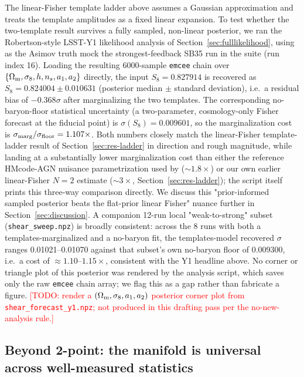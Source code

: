 \documentclass[11pt]{article}
\newcommand{\todo}[1]{\textcolor{red}{[TODO: #1]}}
\begin{document}
The linear-Fisher template ladder above assumes a Gaussian approximation and
treats the template amplitudes as a fixed linear expansion. To test whether
the two-template result survives a fully sampled, non-linear posterior, we
ran the Robertson-style LSST-Y1 likelihood analysis of
Section~\ref{sec:fulllikelihood}, using as the Asimov truth mock the
strongest-feedback SB35 run in the suite (run index 16). Loading the
resulting 6000-sample \texttt{emcee} chain over $\{\Omega_{\rm m},\sigma_8,h,n_s,a_1,a_2\}$
directly, the input $S_8=0.827914$ is recovered as
$S_8=0.824004\pm0.010631$ (posterior median $\pm$ standard deviation),
i.e.\ a residual bias of $-0.368\sigma$ after marginalizing the two
templates. %
The corresponding no-baryon-floor statistical uncertainty (a two-parameter,
cosmology-only Fisher forecast at the fiducial point) is
$\sigma(S_8)=0.009601$, so the marginalization cost is
$\sigma_{\rm marg}/\sigma_{\rm floor}=1.107\times$. %
Both numbers closely match the linear-Fisher template-ladder result of
Section~\ref{sec:res-ladder} in direction and rough magnitude, while landing
at a substantially lower marginalization cost than either the reference
HMcode-AGN nuisance parametrization used by \citet{robertson2026}
($\sim1.8\times$) or our own earlier linear-Fisher $N=2$ estimate
($\sim3\times$, Section~\ref{sec:res-ladder}); the script itself prints
this three-way comparison directly. %
We discuss this "prior-informed sampled posterior beats the flat-prior
linear Fisher" nuance further in Section~\ref{sec:discussion}. A companion
12-run local "weak-to-strong" subset (\texttt{shear\_sweep.npz}) is broadly
consistent: across the 8 runs with both a templates-marginalized and a
no-baryon fit, the templates-model recovered $\sigma$ ranges 0.01021--0.01070
against that subset's own no-baryon floor of 0.009300, i.e.\ a cost of
$\approx1.10$--$1.15\times$, consistent with the Y1 headline above. %
No corner or triangle plot of this posterior was rendered by the analysis
script, which saves only the raw \texttt{emcee} chain array; we flag this as
a gap rather than fabricate a figure. \todo{render a $(\Omega_{\rm m},\sigma_8,a_1,a_2)$
posterior corner plot from \texttt{shear\_forecast\_y1.npz}; not produced in
this drafting pass per the no-new-analysis rule.}

\subsection{Beyond 2-point: the manifold is universal across well-measured statistics}\label{sec:res-manifold}
\end{document}
